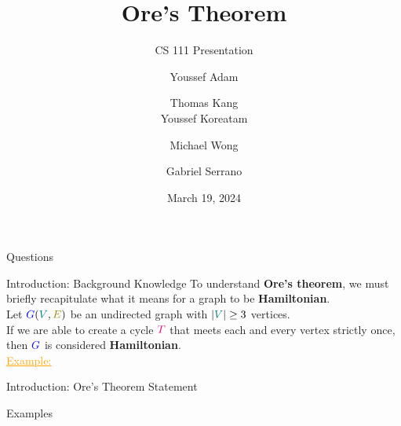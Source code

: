\documentclass[pdf]{beamer}
\title{Ore's Theorem}
\subtitle{CS 111 Presentation}
\author{Youssef Adam \and Thomas Kang \\ Youssef Koreatam \and Michael Wong \and Gabriel Serrano}
\date{March 19, 2024}
\institute{Department of Computer Science, University of California, Riverside}
\newcommand{\G}{\textcolor{blue}{G}}
\newcommand{\V}{\textcolor{teal}{V}}
\newcommand{\E}{\textcolor{olive}{E}}
\newcommand{\T}{\textcolor{magenta}{T}}
\begin{document}
    \begin{frame}
        \titlepage
    \end{frame}

    \begin{frame}{Questions}

    \end{frame}

    \begin{frame}{Introduction: Background Knowledge}
        To understand \textbf{Ore's theorem}, we must briefly recapitulate
        what it means for a graph to be \textbf{Hamiltonian}.
        \pause
        \vspace{10px}
        \\Let $\G(\V,\E)$ be an undirected graph with $|\V| \geq 3$ vertices. \pause
        \\If we are able to create a cycle $\T$ that meets each and every
        vertex strictly once, then $\G$ is considered \textbf{Hamiltonian}.
        \pause
        \vspace{20px}
        \\\textcolor{orange}{\underline{Example:}}
        \vspace{10px}
        \\
    \end{frame}
    \begin{frame}{Introduction: Ore's Theorem Statement}

    \end{frame}

    \begin{frame}{Examples}

    \end{frame}
\end{document}
